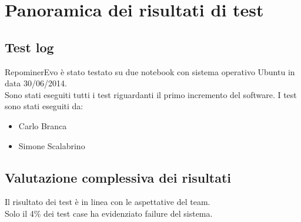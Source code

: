 \chapter{Panoramica dei risultati di test}

\section{Test log}

RepominerEvo è stato testato su due notebook con sistema operativo Ubuntu in data 30/06/2014.\\
Sono stati eseguiti tutti i test riguardanti il primo incremento del software.
I test sono stati eseguiti da:
\begin{itemize}
\item Carlo Branca
\item Simone Scalabrino
\end{itemize}

\section{Valutazione complessiva dei risultati}

Il risultato dei test è in linea con le aspettative del team.\\
Solo il 4\% dei test case ha evidenziato failure del sistema.\\

\clearpage